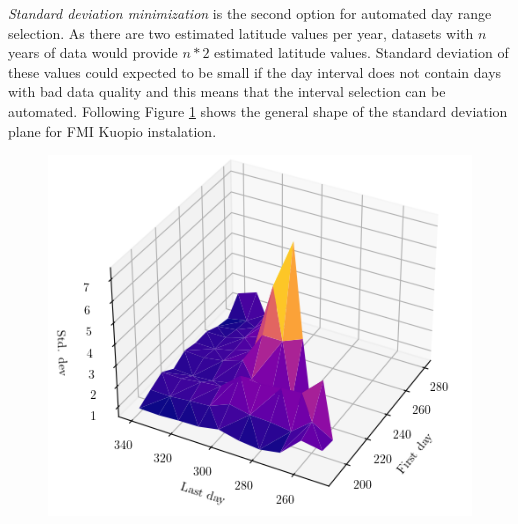 \textit{Standard deviation minimization} is the second option for automated day range selection. As there are two estimated latitude values per year, datasets with $n$ years of data would provide $n*2$ estimated latitude values. Standard deviation of these values could expected to be small if the day interval does not contain days with bad data quality and this means that the interval selection can be automated. Following Figure \ref{fig_heatmap3d2} shows the general shape of the standard deviation plane for FMI Kuopio instalation. 






\begin{figure}[]
\centering
\includegraphics[width=0.5\linewidth]{pics/heatmap3d2}
\label{fig_heatmap3d2}
\end{figure}

